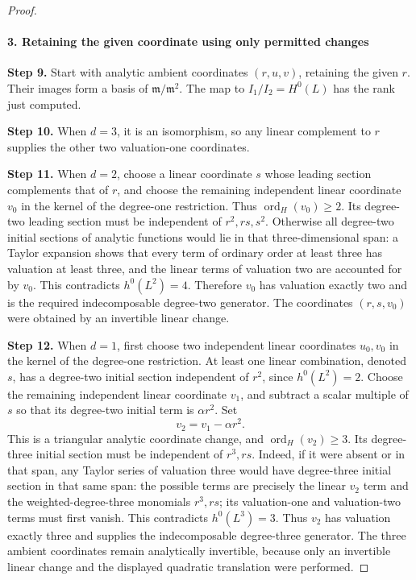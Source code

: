 \begin{proof}
\paragraph{3. Retaining the given coordinate using only permitted changes}

\noindent\textbf{Step 9.} Start with analytic ambient coordinates \((r,u,v)\), retaining
the given \(r\). Their images form a basis of
\(\mathfrak m/\mathfrak m^2\). The map to
\(I_1/I_2=H^0(L)\) has the rank just computed.

\noindent\textbf{Step 10.} When \(d=3\), it is an isomorphism, so any linear complement
to \(r\) supplies the other two valuation-one coordinates.

\noindent\textbf{Step 11.} When \(d=2\), choose a linear coordinate \(s\) whose
leading section complements that of \(r\), and choose the
remaining independent linear coordinate \(v_0\) in the
kernel of the degree-one restriction. Thus
\(\operatorname{ord}_H(v_0)\ge2\). Its degree-two leading
section must be independent of \(r^2,rs,s^2\). Otherwise
all degree-two initial sections of analytic functions would
lie in that three-dimensional span: a Taylor expansion shows
that every term of ordinary order at least three has valuation
at least three, and the linear terms of valuation two are
accounted for by \(v_0\). This contradicts
\(h^0(L^2)=4\). Therefore \(v_0\) has valuation exactly
two and is the required indecomposable degree-two generator.
The coordinates \((r,s,v_0)\) were obtained by an invertible
linear change.

\noindent\textbf{Step 12.} When \(d=1\), first choose two independent linear coordinates
\(u_0,v_0\) in the kernel of the degree-one restriction.
At least one linear combination, denoted \(s\), has a
degree-two initial section independent of \(r^2\), since
\(h^0(L^2)=2\). Choose the remaining independent linear
coordinate \(v_1\), and subtract a scalar multiple of \(s\)
so that its degree-two initial term is \(\alpha r^2\).
Set
\[
                         v_2=v_1-\alpha r^2.
\]
This is a triangular analytic coordinate change, and
\(\operatorname{ord}_H(v_2)\ge3\). Its degree-three
initial section must be independent of \(r^3,rs\).
Indeed, if it were absent or in that span, any Taylor series
of valuation three would have degree-three initial section
in that same span: the possible terms are precisely the
linear \(v_2\) term and the weighted-degree-three monomials
\(r^3,rs\); its valuation-one and valuation-two terms
must first vanish. This contradicts \(h^0(L^3)=3\).
Thus \(v_2\) has valuation exactly three and supplies the
indecomposable degree-three generator. The three ambient
coordinates remain analytically invertible, because only
an invertible linear change and the displayed quadratic
translation were performed.


\end{proof}
